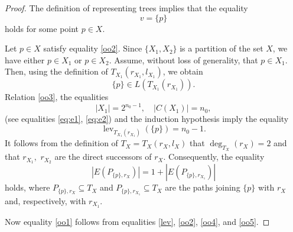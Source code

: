 \documentclass{raex}
\theoremstyle{definition}
\theoremstyle{remark}
\numberwithin{equation}{section}
\begin{document}
\begin{proof}
The definition of representing trees implies that the equality
\begin{equation}
    \label{oo2}
    v=\{p\}
\end{equation}
holds for some point $p\in X$.

Let $p \in X$ satisfy equality  \eqref{oo2}. Since $\{X_1,X_2\}$ is a partition of the set $X$, we have either 
\(
p\in X_1\) or \(p\in X_2.
\)
Assume, 
without loss of generality, that $p\in X_1$. Then, using the definition
of $T_{X_1}(r_{X_1},l_{X_1})$, we obtain
\begin{equation}
    \label{oo3}
\{p\}\in L(T_{X_1}(r_{X_1})).
\end{equation}
Relation \eqref{oo3}, the equalities
\begin{equation*}
    |X_1|=2^{n_0-1}, \quad |C(X_1)|=n_0,
\end{equation*}
(see equalities \eqref{eq:e1}, \eqref{eq:e2}) and the induction hypothesis imply the equality
\begin{equation}
    \label{oo4}
\operatorname{lev}_{T_{X_1}(r_{X_1})}(\{p\})=n_0-1.
\end{equation}
It follows from the definition of
\(
T_X=T_X(r_X,l_X)
\)
that
\(
\deg_{T_X}(r_X)=2
\)
and that $r_{X_1},$ $r_{X_2}$ are the direct successors of $r_X$.
Consequently, the equality
\begin{equation}
    \label{oo5}
|E(P_{\{p\},r_X})|
=
1+|E(P_{\{p\},r_{X_1}})|
\end{equation}
holds, where $P_{\{p\},r_X}\subseteq T_X$ and $P_{\{p\},r_{X_1}}\subseteq T_X$ are the paths
joining $\{p\}$ with $r_X$ and, respectively, with $r_{X_1}$.

Now equality \eqref{oo1} follows from equalities \eqref{lev}, \eqref{oo2}, \eqref{oo4}, and \eqref{oo5}.



\end{proof}
\end{document}
